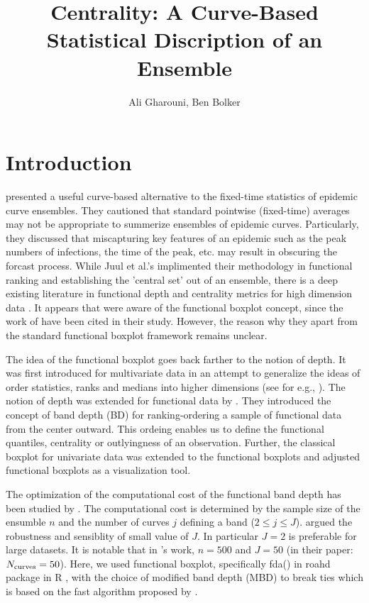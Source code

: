 \documentclass[12pt]{article}
\title{Centrality: A Curve-Based Statistical Discription of an Ensemble}
\author{Ali Gharouni, Ben Bolker}
\newcommand{\pkg}[1]{\textsf{#1}}  %
\theoremstyle{definition} %
\begin{document}
\maketitle
\linenumbers

\section{Introduction}

\cite{juul2021fixed} presented a useful curve-based alternative to the fixed-time statistics of epidemic curve ensembles. 
They cautioned that standard pointwise (fixed-time) averages may not be appropriate to summerize ensembles of epidemic curves. Particularly, they discussed that miscapturing key features of an epidemic such as the peak numbers of infections, the time of the peak, etc. may result in obscuring the forcast process.
While Juul et al.'s implimented their methodology in functional ranking and establishing the 'central set' out of an ensemble, there is a deep existing literature in functional depth and centrality metrics for high dimension data \citep{fraiman2001trimmed, lopez2007depth, lopez2009concept, sun2011functional,sun2012exact}. It appears that \cite{juul2021fixed} were aware of the functional boxplot concept, since the work of \cite{sun2011functional} have been cited in their study. However, the reason why they apart from the standard functional boxplot framework remains unclear.  


The idea of the functional boxplot goes back farther to the notion of depth. It was first introduced for multivariate data in an attempt to generalize the ideas of order statistics, ranks and medians into higher dimensions (see for e.g., \cite{mahalanobis1936generalized,tukey1975mathematics}).
The notion of depth was extended for functional data by \citep{lopez2009concept}. They introduced the concept of band depth (BD) for ranking-ordering  a sample of functional data from the center outward. This ordeing enables us to define the functional quantiles, centrality or outlyingness of an observation. Further, the classical boxplot for univariate data was extended to the functional boxplots and adjusted functional boxplots \citep{sun2011functional,sun2012adjusted} as a visualization tool. 

The optimization of the computational cost of the functional band depth has been studied by \citep{sun2012exact}. The computational cost is determined by the sample size of the ensumble $n$ and the number of curves $j$ defining a band ($2\leq j \leq J$). \cite{sun2012exact} argued the robustness and sensiblity of  small value of $J$. In particular $J=2$ is preferable for large datasets. It is notable that in \cite{juul2021fixed}'s work, $n=500$ and $J=50$ (in their paper: $N_{\rm{curves}}=50$). Here, we used functional boxplot, specifically fda() in \pkg{roahd} package \citep{roahd} in R \citep{R}, with the choice of modified band depth (MBD) to break ties which is based on the fast algorithm proposed by \cite{sun2012exact}.  
\end{document}
